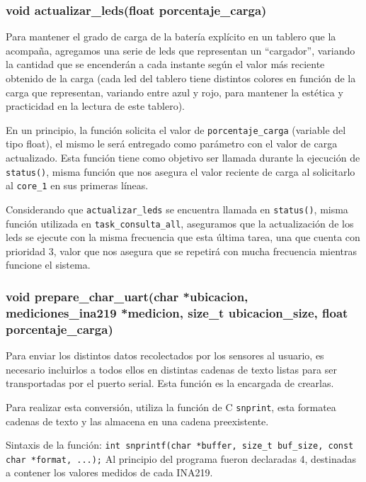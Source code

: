             \subsubsection{void actualizar\_leds(float porcentaje\_carga)}
                Para mantener el grado de carga de la batería explícito en un tablero que la acompaña, agregamos una serie de leds que representan un “cargador”, variando la cantidad que se encenderán a cada instante según el valor más reciente obtenido de la carga (cada led del tablero tiene distintos colores en función de la carga que representan, variando entre azul y rojo, para mantener la estética y practicidad en la lectura de este tablero).\par
                En un principio, la función solicita el valor de \texttt{porcentaje\_carga} (variable del tipo float), el mismo le será entregado como parámetro con el valor de carga actualizado. Esta función tiene como objetivo ser llamada durante la ejecución de \texttt{status()}, misma función que nos asegura el valor reciente de carga al solicitarlo al \texttt{core\_1} en sus primeras líneas.\par
                Considerando que \texttt{actualizar\_leds} se encuentra llamada en \texttt{status()}, misma función utilizada en \texttt{task\_consulta\_all}, aseguramos que la actualización de los leds se ejecute con la misma frecuencia que esta última tarea, una que cuenta con prioridad 3, valor que nos asegura que se repetirá con mucha frecuencia mientras funcione el sistema.\par

                \subsubsection{void prepare\_char\_uart(char *ubicacion, mediciones\_ina219 *medicion, size\_t ubicacion\_size, float porcentaje\_carga)}
                    Para enviar los distintos datos recolectados por los sensores al usuario, es necesario incluirlos a todos ellos en distintas cadenas de texto listas para ser transportadas por el puerto serial. Esta función es la encargada de crearlas.\par
                    Para realizar esta conversión, utiliza la función de C \texttt{snprint}, esta formatea cadenas de texto y las almacena en una cadena preexistente.\par
                    Sintaxis de la función: \texttt{int snprintf(char *buffer, size\_t buf\_size, const char *format, ...);}
                    Al principio del programa fueron declaradas 4, destinadas a contener los valores medidos de cada INA219.\par

